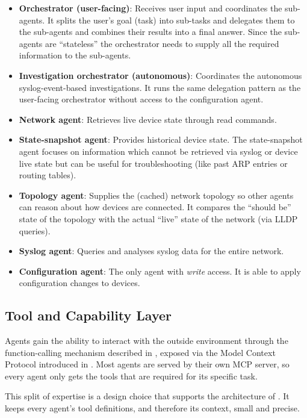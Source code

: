 \begin{itemize}
    \item \textbf{Orchestrator (user-facing)}: Receives user input and coordinates the sub-agents. It splits
          the user's goal (task) into sub-tasks and delegates them to the sub-agents and combines their results into a final answer. Since the sub-agents are \enquote{stateless} the orchestrator
          needs to supply all the required information to the sub-agents.
    \item \textbf{Investigation orchestrator (autonomous)}: Coordinates the autonomous syslog-event-based investigations.
          It runs the same delegation pattern as the user-facing
          orchestrator without access to the configuration agent.
    \item \textbf{Network agent}: Retrieves live device state through read commands.
    \item \textbf{State-snapshot agent}: Provides historical device state. The state-snapshot agent focuses on information which cannot be retrieved via syslog or
          device live state but can be useful for troubleshooting (like past ARP entries or routing tables).
    \item \textbf{Topology agent}: Supplies the (cached) network topology so other agents can reason about how
          devices are connected. It compares the \enquote{should be} state of the topology with the actual \enquote{live} state of the network (via LLDP queries).
    \item \textbf{Syslog agent}: Queries and analyses syslog data for the entire network.
    \item \textbf{Configuration agent}: The only agent with \emph{write} access. It is able to apply
          configuration changes to devices.
\end{itemize}

\subsection{Tool and Capability Layer}
\label{sec:tool-layer}
Agents gain the ability to interact with the outside environment through the function-calling mechanism described in
, exposed via the Model Context Protocol introduced in . Most
agents are served by their own MCP server, so every agent only gets the tools that are required
for its specific task.

This split of expertise is a design choice that supports the architecture of
. It keeps every agent's tool definitions, and therefore its context, small and precise.

